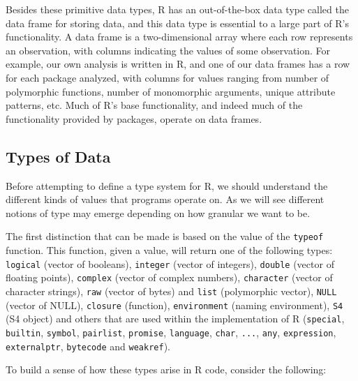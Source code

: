 \documentclass[acmsmall,10pt,review,anonymous]{acmart}\settopmatter{printfolios=true,printccs=false,printacmref=false}
\newcommand{\code}[1]{\lstinline|#1|\xspace}
\begin{document}
Besides these primitive data types, R has an out-of-the-box data type called the data frame for storing data, and this data type is essential to a large part of R's functionality.
A data frame is a two-dimensional array where each row represents an observation, with columns indicating the values of some observation.
For example, our own analysis is written in R, and one of our data frames has a row for each package analyzed, with columns for values ranging from number of polymorphic functions, number of monomorphic arguments, unique attribute patterns, etc.
Much of R's base functionality, and indeed much of the functionality provided by packages, operate on data frames.

\subsection{Types of Data}

Before attempting to define a type system for R, we should understand the
different kinds of values that programs operate on.  As we will see
different notions of type may emerge depending on how granular we want to
be.

The first distinction that can be made is based on the value of the
\code{typeof} function.  This function, given a value, will return one of
the following types: \code{logical} (vector of booleans), \code{integer}
(vector of integers), \code{double} (vector of floating points),
\code{complex} (vector of complex numbers), \code{character} (vector of
character strings), \code{raw} (vector of bytes) and \code{list}
(polymorphic vector), \code{NULL} (vector of NULL),
\code{closure} (function), \code{environment} (naming environment),
\code{S4} (S4 object) and others that are used within the implementation of
R (\code{special}, \code{builtin}, \code{symbol}, \code{pairlist},
\code{promise}, \code{language}, \code{char}, \code{...}, \code{any},
\code{expression}, \code{externalptr}, \code{bytecode} and \code{weakref}).

\AT{Some examples of use of \code{typeof}:} To build a sense of how these
types arise in R code, consider the following: 
\end{document}
